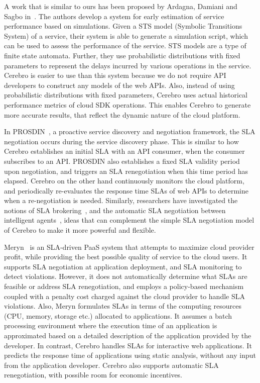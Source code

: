 A work that is similar to ours has been proposed by Ardagna, Damiani and Sagbo in~\cite{6649675}. 
The authors develop
a system for early estimation of service performance based on simulations. Given a STS
model (Symbolic Transitions System) of a service, their system is able to generate a simulation script, which
can be used to assess the performance of the service. STS models are a type of finite state automata. 
Further, they use probabilistic distributions with fixed parameters
to represent the delays incurred by various operations in the service. Cerebro is easier to use than this
system because we do not require API developers to construct any models of the web APIs. 
Also, instead of using probabilistic distributions
with fixed parameters, Cerebro uses actual historical performance metrics of cloud SDK operations. This enables
Cerebro to generate more accurate results, that reflect the dynamic nature of the cloud platform.

In PROSDIN~\cite{Mahbub:2011:PSN:2061042.2062022}, a proactive service discovery and negotiation
framework, the SLA negotiation occurs during the service discovery phase. This is similar to how
Cerebro establishes an initial SLA with an API consumer, when the consumer subscribes to an API. PROSDIN also
establishes a fixed SLA validity period upon negotiation, and triggers an SLA renegotiation when this time period has 
elapsed. Cerebro on the other hand continuously monitors the cloud platform,
and periodically re-evaluates the response time SLAs of web APIs 
to determine when a re-negotiation is needed.
Similarly, researchers have investigated the notions of SLA brokering~\cite{6546098}, and the automatic SLA negotiation
between intelligent agents~\cite{Yaqub:2014:ONS:2680847.2681496}, ideas that can complement the
simple SLA negotiation model of Cerebro to make it more powerful and flexible.

Meryn~\cite{Dib:2013:MOS:2465823.2465825} is an SLA-driven PaaS system that attempts to maximize cloud
provider profit, while providing the best possible quality of service to the cloud users. It supports
SLA negotiation at application deployment, and SLA monitoring to detect
violations. However, it does not automatically determine what SLAs are
feasible or address SLA renegotiation, 
and employs a policy-based mechanism coupled
with a penalty cost charged against the cloud provider to
handle SLA violations. Also, Meryn formulates SLAs in terms of the computing resources (CPU, memory,
storage etc.) allocated to applications. It assumes a batch processing environment where the
execution time of an application is approximated based on a detailed description of the application provided
by the developer. In contrast, Cerebro handles SLAs for interactive web applications. It predicts
the response time of applications using static analysis, without any input from the application developer. 
Cerebro also supports automatic SLA renegotiation, with possible room for economic incentives.

